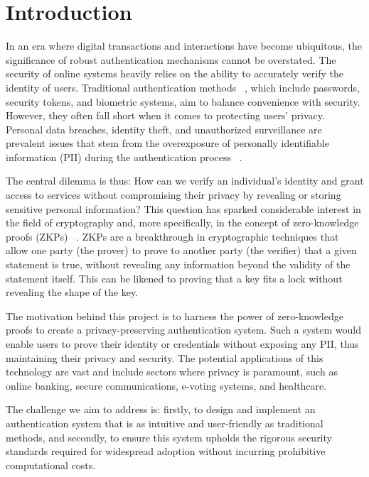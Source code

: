 \section{Introduction}
\label{sec:intro}

In an era where digital transactions and interactions have become ubiquitous, the significance of robust authentication mechanisms cannot be overstated. The security of online systems heavily relies on the ability to accurately verify the identity of users. Traditional authentication methods ~\cite{idrus2013reviewauth}, which include passwords, security tokens, and biometric systems, aim to balance convenience with security. However, they often fall short when it comes to protecting users' privacy. Personal data breaches, identity theft, and unauthorized surveillance are prevalent issues that stem from the overexposure of personally identifiable information (PII) during the authentication process ~\cite{wang2021authattacks}.

The central dilemma is thus: How can we verify an individual's identity and grant access to services without compromising their privacy by revealing or storing sensitive personal information? This question has sparked considerable interest in the field of cryptography and, more specifically, in the concept of zero-knowledge proofs (ZKPs) ~\cite{goldwasser1989zkp}. ZKPs are a breakthrough in cryptographic techniques that allow one party (the prover) to prove to another party (the verifier) that a given statement is true, without revealing any information beyond the validity of the statement itself. This can be likened to proving that a key fits a lock without revealing the shape of the key.

The motivation behind this project is to harness the power of zero-knowledge proofs to create a privacy-preserving authentication system. Such a system would enable users to prove their identity or credentials without exposing any PII, thus maintaining their privacy and security. The potential applications of this technology are vast and include sectors where privacy is paramount, such as online banking, secure communications, e-voting systems, and healthcare.

The challenge we aim to address is: firstly, to design and implement an authentication system that is as intuitive and user-friendly as traditional methods, and secondly, to ensure this system upholds the rigorous security standards required for widespread adoption without incurring prohibitive computational costs.

